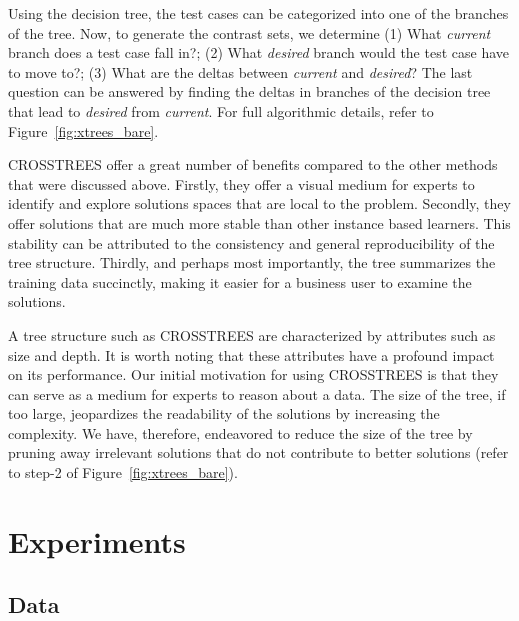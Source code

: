\documentclass{sig-alternate}
\newcommand{\fig}[1]{Figure~\ref{fig:#1}}
\begin{document}
Using the decision tree, the test cases can be categorized into one of the branches of the tree. Now, to generate the contrast sets, we determine (1) What \textit{current} branch does a test case fall in?; (2) What \textit{desired} branch would the test case have to move to?; (3) What are the deltas between \textit{current} and \textit{desired}? The last question can be answered by finding the deltas in branches of the decision tree that lead to \textit{desired} from \textit{current}. For full algorithmic details, refer to \fig{xtrees_bare}.

CROSSTREES offer a great number of benefits compared to the other methods that were discussed above. Firstly, they offer a visual medium for experts to identify and explore solutions spaces that are local to the problem. Secondly, they offer solutions that are much more stable than other instance based learners. This stability can be attributed to the consistency and general reproducibility of the tree structure. Thirdly, and perhaps most importantly, the tree summarizes the training data succinctly, making it easier for a business user to examine the solutions.

A tree structure such as CROSSTREES are characterized by attributes such as size and depth. It is worth noting that these attributes have a profound impact on its performance. Our initial motivation for using CROSSTREES is that they can serve as a medium for experts to reason about a data. The size of the tree, if too large, jeopardizes the readability of the solutions by increasing the complexity. We have, therefore, endeavored to reduce the size of the tree by pruning away irrelevant solutions that do not contribute to better solutions (refer to step-2 of \fig{xtrees_bare}). 


\section{Experiments}

\subsection{Data}
\end{document}

